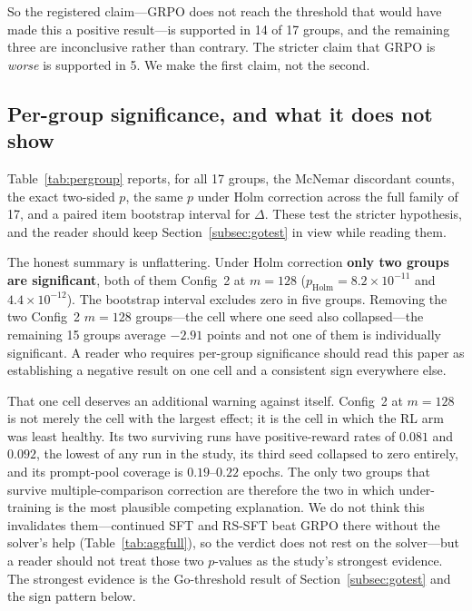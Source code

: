 So the registered claim---GRPO does not reach the threshold that would have
made this a positive result---is supported in 14 of 17 groups, and the
remaining three are inconclusive rather than contrary. The stricter claim that
GRPO is \emph{worse} is supported in 5. We make the first claim, not the
second.

\subsection{Per-group significance, and what it does not show}



Table~\ref{tab:pergroup} reports, for all 17 groups, the McNemar discordant
counts, the exact two-sided $p$, the same $p$ under Holm correction across the
full family of 17, and a paired item bootstrap interval for $\Delta$. These
test the stricter hypothesis, and the reader should keep
Section~\ref{subsec:gotest} in view while reading them.

The honest summary is unflattering. Under Holm correction \textbf{only two
groups are significant}, both of them Config~2 at $m{=}128$
($p_{\text{Holm}} = 8.2{\times}10^{-11}$ and $4.4{\times}10^{-12}$). The
bootstrap interval excludes zero in five groups. Removing the two Config~2
$m{=}128$ groups---the cell where one seed also collapsed---the remaining 15
groups average $-2.91$ points and not one of them is individually significant.
A reader who requires per-group significance should read this paper as
establishing a negative result on one cell and a consistent sign everywhere
else.

That one cell deserves an additional warning against itself. Config~2 at
$m{=}128$ is not merely the cell with the largest effect; it is the cell in
which the RL arm was least healthy. Its two surviving runs have
positive-reward rates of $0.081$ and $0.092$, the lowest of any run in the
study, its third seed collapsed to zero entirely, and its prompt-pool coverage
is $0.19$--$0.22$ epochs. The only two groups that survive multiple-comparison
correction are therefore the two in which under-training is the most plausible
competing explanation. We do not think this invalidates them---continued SFT
and RS-SFT beat GRPO there without the solver's help
(Table~\ref{tab:aggfull}), so the verdict does not rest on the solver---but a
reader should not treat those two $p$-values as the study's strongest evidence.
The strongest evidence is the Go-threshold result of
Section~\ref{subsec:gotest} and the sign pattern below.


